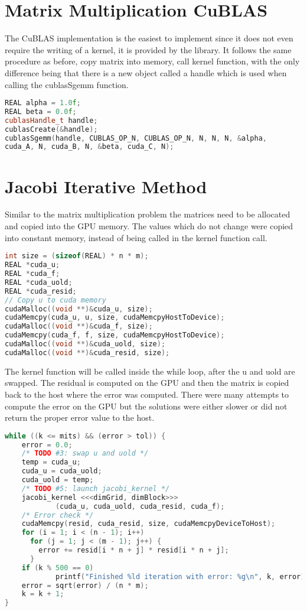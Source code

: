 \documentclass[a4paper]{article}
\begin{document}
\section*{Matrix Multiplication CuBLAS}
The CuBLAS implementation is the easiest to implement since it does not even require the writing of a kernel, it is provided by the library. It follows the same procedure as before, copy matrix into memory, call kernel function, with the only difference being that there is a new object called a handle which is used when calling the cublasSgemm function.
\begin{lstlisting}[language=C++]
REAL alpha = 1.0f;
REAL beta = 0.0f;
cublasHandle_t handle;
cublasCreate(&handle);
cublasSgemm(handle, CUBLAS_OP_N, CUBLAS_OP_N, N, N, N, &alpha, 
cuda_A, N, cuda_B, N, &beta, cuda_C, N);
\end{lstlisting}

\section*{Jacobi Iterative Method}
Similar to the matrix multiplication problem the matrices need to be allocated and copied into the GPU memory. The values which do not change were copied into constant memory, instead of being called in the kernel function call.
\begin{lstlisting}[language=C++]
int size = (sizeof(REAL) * n * m);
REAL *cuda_u;
REAL *cuda_f;
REAL *cuda_uold;
REAL *cuda_resid;
// Copy u to cuda memory
cudaMalloc((void **)&cuda_u, size);
cudaMemcpy(cuda_u, u, size, cudaMemcpyHostToDevice);
cudaMalloc((void **)&cuda_f, size);
cudaMemcpy(cuda_f, f, size, cudaMemcpyHostToDevice);
cudaMalloc((void **)&cuda_uold, size);
cudaMalloc((void **)&cuda_resid, size);
\end{lstlisting}

The kernel function will be called inside the while loop, after the u and uold are swapped. The residual is computed on the GPU and then the matrix is copied back to the host where the error was computed. There were many attempts to compute the error on the GPU but the solutions were either slower or did not return the proper error value to the host.
\begin{lstlisting}[language=C++]
while ((k <= mits) && (error > tol)) {
	error = 0.0;
    /* TODO #3: swap u and uold */
    temp = cuda_u;
    cuda_u = cuda_uold;
    cuda_uold = temp;
    /* TODO #5: launch jacobi_kernel */
    jacobi_kernel <<<dimGrid, dimBlock>>> 
    		(cuda_u, cuda_uold, cuda_resid, cuda_f);
    /* Error check */
    cudaMemcpy(resid, cuda_resid, size, cudaMemcpyDeviceToHost);
    for (i = 1; i < (n - 1); i++)
      for (j = 1; j < (m - 1); j++) {
        error += resid[i * n + j] * resid[i * n + j];
      }
    if (k % 500 == 0) 
    		printf("Finished %ld iteration with error: %g\n", k, error);   		
	error = sqrt(error) / (n * m);
    k = k + 1;
}
\end{lstlisting}
\end{document}
